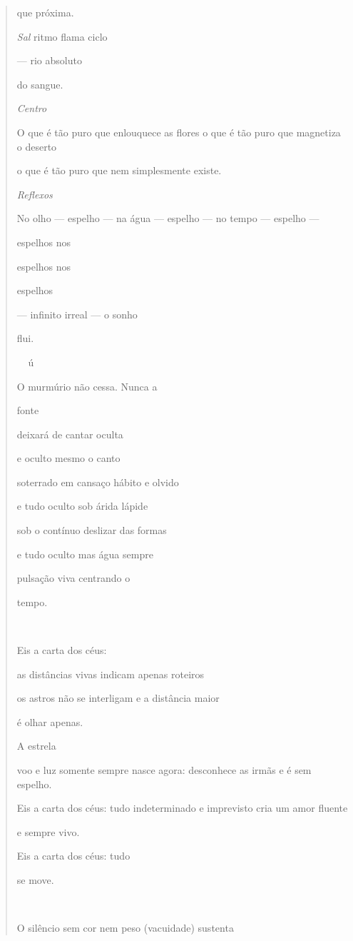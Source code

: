 \begin{quote}
que próxima.

\emph{Sal} ritmo flama ciclo

--- rio absoluto

do sangue.

\emph{Centro}

O que é tão puro que enlouquece as flores o que é tão puro que magnetiza
o deserto

o que é tão puro que nem simplesmente existe.

\emph{Reflexos}

No olho --- espelho --- na água --- espelho --- no tempo --- espelho ---

espelhos nos

espelhos nos

espelhos

--- infinito irreal --- o sonho

flui.

ú

O murmúrio não cessa. Nunca a

fonte

deixará de cantar oculta

e oculto mesmo o canto

soterrado em cansaço hábito e olvido

e tudo oculto sob árida lápide

sob o contínuo deslizar das formas

e tudo oculto mas água sempre

pulsação viva centrando o

tempo.



Eis a carta dos céus:

as distâncias vivas indicam apenas roteiros

os astros não se interligam e a distância maior

é olhar apenas.

A estrela

voo e luz somente sempre nasce agora: desconhece as irmãs e é sem
espelho.

Eis a carta dos céus: tudo indeterminado e imprevisto cria um amor
fluente

e sempre vivo.

Eis a carta dos céus: tudo

se move.



O silêncio sem cor nem peso (vacuidade) sustenta


\end{quote}
